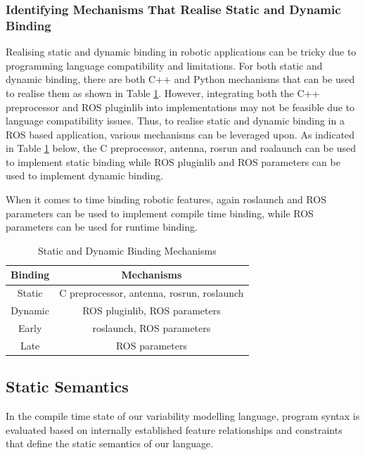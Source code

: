 \documentclass[conference]{IEEEtran}
\begin{document}
\subsubsection{Identifying Mechanisms That Realise Static and Dynamic Binding}
Realising static and dynamic binding in robotic applications can be tricky due to programming language compatibility and limitations. For both static and dynamic binding, there are both C++ and Python mechanisms that can be used to realise them as shown in Table \ref{tab:realmecha}. However, integrating both the C++ preprocessor and ROS pluginlib into implementations may not be feasible due to language compatibility issues. Thus, to realise static and dynamic binding in a ROS based application, various mechanisms can be leveraged upon. As indicated in Table \ref{tab:realmecha} below, the C preprocessor, antenna, rosrun and roalaunch can be used to implement static binding while ROS pluginlib and ROS parameters can be used to implement dynamic binding.

When it comes to time binding robotic features, again roslaunch and ROS parameters can be used to implement compile time binding, while ROS parameters can be used for runtime binding.

\begin{table}[htbp]
	\caption{Static and Dynamic Binding Mechanisms}
	\begin{center}
		\begin{tabular}{|c|c|}
			\hline
			Binding & Mechanisms  \\ \hline
			Static & C preprocessor, antenna, rosrun, roslaunch \\ \hline
			Dynamic &  ROS pluginlib, ROS parameters  \\ \hline
			Early &  roslaunch, ROS parameters  \\ \hline
			Late &  ROS parameters  \\ \hline
		\end{tabular}
		\label{tab:realmecha}
	\end{center}
\end{table}

\subsection{Static Semantics}
In the compile time state of our variability modelling language, program syntax is evaluated based on internally established feature relationships and constraints that define the static semantics of our language.
\end{document}
